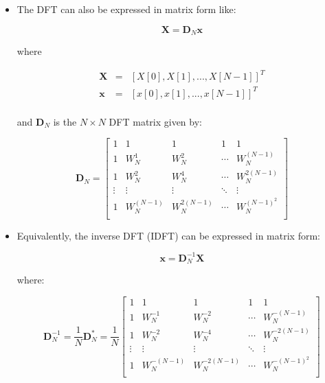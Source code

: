 \documentclass[a4paper,11pt,oneside]{article}
\def\x{{\mathbf x}}
\def\X{{\mathbf X}}
\def\x{{\mathbf x}}
\def\D{{\mathbf D}}
\def\D{{\mathbf D}}
\begin{document}
\begin{itemize}
\item The DFT can also be expressed in matrix form like:

\begin{equation}
\X = \D_{N}\x
\end{equation}

where 

\[
\begin{array}{lll}
\X &=& \left[X[0],X[1],...,X[N-1]\right]^{T}\\
\x &=& \left[x[0],x[1],...,x[N-1]\right]^{T}\\
\end{array}
\]

and $\D_{N}$ is the $N\times N$ DFT matrix given by:

\begin{equation}
\D_{N}=\left[ 
\begin{array}{lllll}
1 & 1 & 1 & 1 & 1\\
1 & W_{N}^{1}& W_{N}^{2} & \cdots & W_{N}^{(N-1)} \\ 
1 & W_{N}^{2}& W_{N}^{4} & \cdots & W_{N}^{2(N-1)} \\
\vdots & \vdots & \vdots & \ddots & \vdots\\
1 & W_{N}^{(N-1)}& W_{N}^{2(N-1)} & \cdots & W_{N}^{(N-1)^{2}} \\
\end{array}
\right]
\end{equation}


\item Equivalently, the inverse DFT (IDFT) can be expressed in matrix form:

\begin{equation}
\x = \D_{N}^{-1}\X
\end{equation}

where:

\begin{equation}
\D_{N}^{-1}=\frac{1}{N}\D_{N}^{*}=\frac{1}{N}\left[ 
\begin{array}{lllll}
1 & 1 & 1 & 1 & 1\\
1 & W_{N}^{-1}& W_{N}^{-2} & \cdots & W_{N}^{-(N-1)} \\ 
1 & W_{N}^{-2}& W_{N}^{-4} & \cdots & W_{N}^{-2(N-1)} \\
\vdots & \vdots & \vdots & \ddots & \vdots\\
1 & W_{N}^{-(N-1)}& W_{N}^{-2(N-1)} & \cdots & W_{N}^{-(N-1)^{2}} \\
\end{array}
\right]
\end{equation}


\end{itemize}
\end{document}
